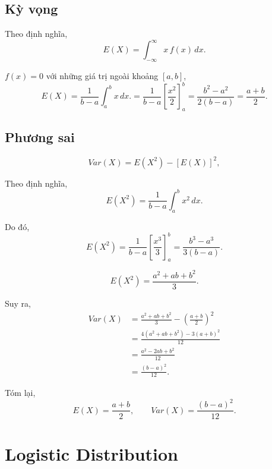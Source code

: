 \subsection*{Kỳ vọng}

Theo định nghĩa,
\[
E(X)
=
\int_{-\infty}^{\infty}
x\,f(x)\,dx.
\]

\(f(x)=0\) với những giá trị ngoài khoảng \([a,b]\),
\[
E(X)
=
\frac1{b-a}
\int_a^b x\,dx.
=
\frac1{b-a}
\left[
\frac{x^2}{2}
\right]_a^b
=
\frac{b^2-a^2}{2(b-a)}=\frac{a+b}{2}.
\]

\subsection*{Phương sai}
\[
Var(X)
=
E(X^2)-[E(X)]^2,
\]

Theo định nghĩa,
\[
E(X^2)
=
\frac1{b-a}
\int_a^b x^2\,dx.
\]

Do đó,
\[
E(X^2)
=
\frac1{b-a}
\left[
\frac{x^3}{3}
\right]_a^b
=
\frac{b^3-a^3}{3(b-a)}.
\]

\[
\boxed{
E(X^2)
=
\frac{a^2+ab+b^2}{3}.
}
\]

Suy ra,
\[
\begin{aligned}
Var(X)
&=
\frac{a^2+ab+b^2}{3}
-
\left(
\frac{a+b}{2}
\right)^2\\
&=
\frac{
4(a^2+ab+b^2)
-
3(a+b)^2
}{12}\\
&=
\frac{
a^2-2ab+b^2
}{12}\\
&=
\boxed{
\frac{(b-a)^2}{12}.
}
\end{aligned}
\]

Tóm lại,
\[
\boxed{
E(X)=\frac{a+b}{2},
\qquad
Var(X)=\frac{(b-a)^2}{12}.
}
\]

\section{Logistic Distribution}
\label{sec:Logistic_Distribution}

